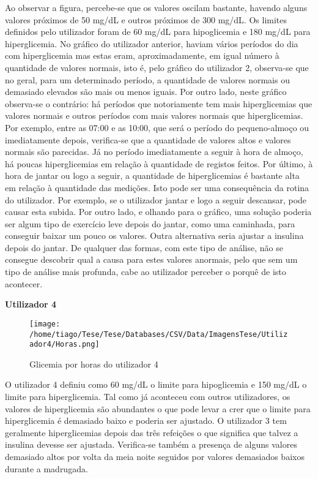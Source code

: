 Ao observar a figura, percebe-se que os valores oscilam bastante, havendo alguns valores próximos de 50 mg/dL e outros próximos de 300 mg/dL. Os limites definidos pelo utilizador foram de 60 mg/dL para hipoglicemia e 180 mg/dL para hiperglicemia. No gráfico do utilizador anterior, haviam vários períodos do dia com hiperglicemia mas estas eram, aproximadamente, em igual número à quantidade de valores normais, isto é, pelo gráfico do utilizador 2, observa-se que no geral, para um determinado período, a quantidade de valores normais ou demasiado elevados são mais ou menos iguais. Por outro lado, neste gráfico observa-se o contrário: há períodos que notoriamente tem mais hiperglicemias que valores normais e outros períodos com mais valores normais que hiperglicemias. 
Por exemplo, entre as 07:00 e as 10:00, que será o período do pequeno-almoço ou imediatamente depois, verifica-se que a quantidade de valores altos e valores normais são parecidas. Já no período imediatamente a seguir à hora de almoço, há poucas hiperglicemias em relação à quantidade de registos feitos. Por último, à hora de jantar ou logo a seguir, a quantidade de hiperglicemias é bastante alta em relação à quantidade das medições. Isto pode ser uma consequência da rotina do utilizador. Por exemplo, se o utilizador jantar e logo a seguir descansar, pode causar esta subida. Por outro lado, e olhando para o gráfico, uma solução poderia ser algum tipo de exercício leve depois do jantar, como uma caminhada, para conseguir baixar um pouco os valores. Outra alternativa seria ajustar a insulina depois do jantar. 
De qualquer das formas, com este tipo de análise, não se consegue descobrir qual a causa para estes valores anormais, pelo que sem um tipo de análise mais profunda, cabe ao utilizador perceber o porquê de isto acontecer.



\textbf{Utilizador 4}

\begin{figure}[H]
\centering
\texttt{[image: /home/tiago/Tese/Tese/Databases/CSV/Data/ImagensTese/Utilizador4/Horas.png]}
\caption{Glicemia por horas do utilizador 4}
\end{figure}

O utilizador 4 definiu como 60 mg/dL o limite para hipoglicemia e 150 mg/dL o limite para hiperglicemia. Tal como já aconteceu com outros utilizadores, os valores de hiperglicemia são abundantes o que pode levar a crer que o limite para hiperglicemia é demasiado baixo e poderia ser ajustado. O utilizador 3 tem geralmente hiperglicemias depois das três refeições o que significa que talvez a insulina devesse ser ajustada. Verifica-se também a presença de alguns valores demasiado altos por volta da meia noite seguidos por valores demasiados baixos durante a madrugada. 


